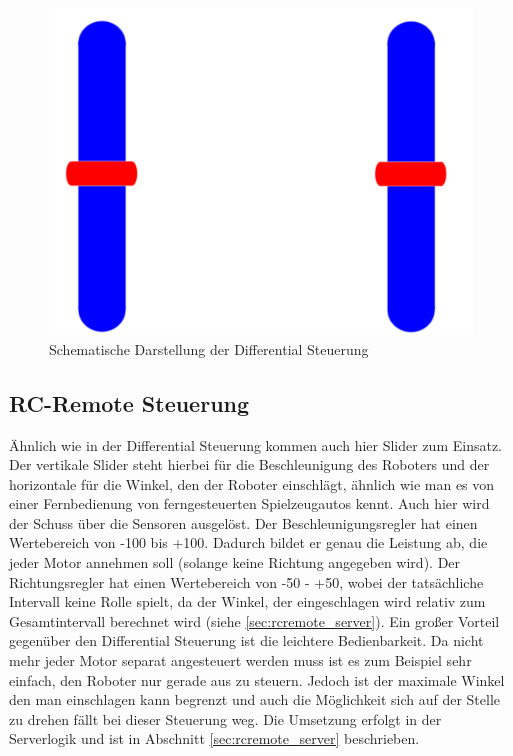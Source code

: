 \begin{figure}[h!]
	\centering
	\includegraphics[height=.25\textheight]{images/android_diff.pdf}
	\caption{Schematische Darstellung der Differential Steuerung}
	\label{fig:android_diff}
\end{figure}

\subsection{RC-Remote Steuerung}

Ähnlich wie in der Differential Steuerung kommen auch hier Slider zum Einsatz. Der vertikale Slider steht hierbei für die Beschleunigung des Roboters und der horizontale für die Winkel, den der Roboter einschlägt, ähnlich wie man es von einer Fernbedienung von ferngesteuerten Spielzeugautos kennt. Auch hier wird der Schuss über die Sensoren ausgelöst. Der Beschleunigungsregler hat einen Wertebereich von -100 bis +100. Dadurch bildet er genau die Leistung ab, die jeder Motor annehmen soll (solange keine Richtung angegeben wird). Der Richtungsregler hat einen Wertebereich von -50 - +50, wobei der tatsächliche Intervall keine Rolle spielt, da der Winkel, der eingeschlagen wird relativ zum Gesamtintervall berechnet wird (siehe \ref{sec:rcremote_server}). Ein großer Vorteil gegenüber den Differential Steuerung ist die leichtere Bedienbarkeit. Da nicht mehr jeder Motor separat angesteuert werden muss ist es zum Beispiel sehr einfach, den Roboter nur gerade aus zu steuern. Jedoch ist der maximale Winkel den man einschlagen kann begrenzt und auch die Möglichkeit sich auf der Stelle zu drehen fällt bei dieser Steuerung weg. Die Umsetzung erfolgt in der Serverlogik und ist in Abschnitt \ref{sec:rcremote_server} beschrieben.


